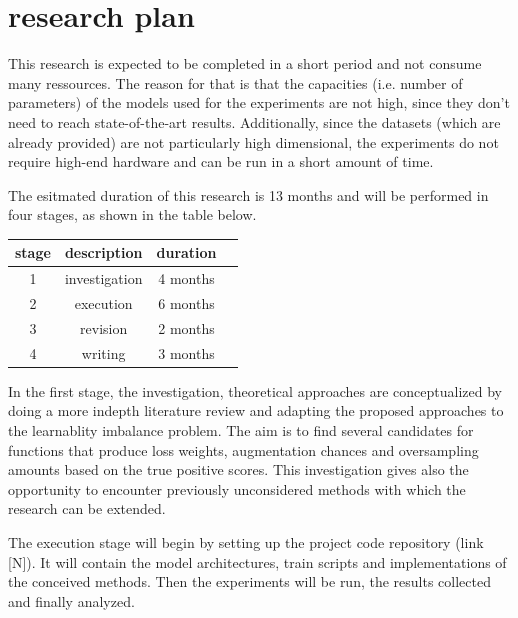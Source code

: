 \documentclass[journal]{IEEEtran}
\begin{document}
\section{research plan}
This research is expected to be completed in a short period and not consume many ressources.
The reason for that is that the capacities (i.e. number of parameters) of the models used for the experiments are not high, since they don't need to reach state-of-the-art results.
Additionally, since the datasets (which are already provided) are not particularly high dimensional, the experiments do not require high-end hardware and can be run in a short amount of time.

The esitmated duration of this research is 13 months and will be performed in four stages, as shown in the table below.

\begin{center}

        \begin{tabular}{ |c|c|c|c| } 
                \hline
                stage & description & duration \\
                \hline
                1 & investigation & 4 months \\ 
                2 & execution & 6 months \\ 
                3 & revision & 2 months \\ 
                4 & writing & 3 months \\
                \hline

        \end{tabular}
\end{center}
        
In the first stage, the investigation, theoretical approaches are conceptualized by doing a more indepth literature review and adapting the proposed approaches to the learnablity imbalance problem. 
The aim is to find several candidates for functions that produce loss weights, augmentation chances and oversampling amounts based on the true positive scores.
This investigation gives also the opportunity to encounter previously unconsidered methods with which the research can be extended.

The execution stage will begin by setting up the project code repository (link [N]). 
It will contain the model architectures, train scripts and implementations of the conceived methods.
Then the experiments will be run, the results collected and finally analyzed. 
\end{document}
